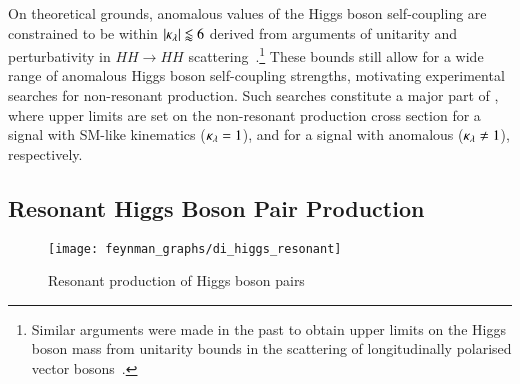 %
On theoretical grounds, anomalous values of the Higgs boson self-coupling are
constrained to be within $|\kappa_{\lambda}| \lessapprox 6$ derived from arguments of
unitarity and perturbativity in $HH \to HH$
scattering~\cite{DiLuzio:2017tfn}.\footnote{Similar arguments were made in the
  past to obtain upper limits on the Higgs boson mass from unitarity bounds in
  the scattering of longitudinally polarised vector bosons~\cite{Lee:1977eg}.}
These bounds still allow for a wide range of anomalous Higgs boson self-coupling
strengths, motivating experimental searches for non-resonant \HH
production. Such searches constitute a major part of
, where upper limits are set on the
non-resonant \HH production cross section for a signal with SM-like kinematics
($\kappa_{\lambda} = 1$), and for a signal with anomalous \klambda ($\kappa_{\lambda} \neq 1$),
respectively.


\subsection{Resonant Higgs Boson Pair Production}%
\label{sec:bsm_resonant_hh}


\begin{figure}[htbp]
  \centering

  \texttt{[image: feynman\_graphs/di\_higgs\_resonant]}

  \caption{Resonant production of Higgs boson pairs}%
  \label{fig:resonant_production_feyn}
\end{figure}








